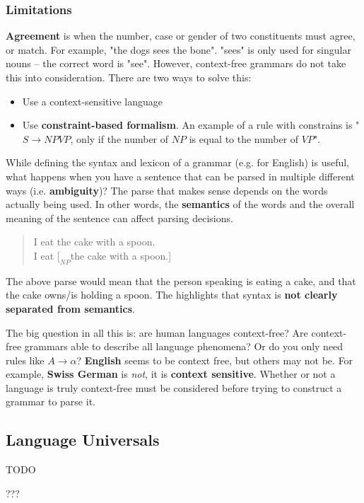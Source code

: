 \documentclass{article}
\begin{document}
\subsubsection{Limitations}

\textbf{Agreement} is when  the number, case or gender of two constituents must agree, or match. For example, "the dogs sees the bone". "sees" is only used for singular nouns -- the correct word is "see". However, context-free grammars do not take this into consideration. There are two ways to solve this:
\begin{itemize}
	\item Use a context-sensitive language
	\item Use \textbf{constraint-based formalism}. An example of a rule with constrains is "$S \rightarrow NP VP$, only if the number of $NP$ is equal to the number of $VP$".
\end{itemize}

While defining the syntax and lexicon of a grammar (e.g. for English) is useful, what happens when you have a sentence that can be parsed in multiple different ways (i.e. \textbf{ambiguity})? The parse that makes sense depends on the words actually being used. In other words, the \textbf{semantics} of the words and the overall meaning of the sentence can affect parsing decisions.
\begin{quote}
	I eat the cake with a spoon. \\
	I eat $[_{NP}$the cake with a spoon.]
\end{quote}
The above parse would mean that the person speaking is eating a cake, and that the cake owns/is holding a spoon. The highlights that syntax is \textbf{not clearly separated from semantics}.

The big question in all this is: are human languages context-free? Are context-free grammars able to describe all language phenomena? Or do you only need rules like $A \rightarrow \alpha$? \textbf{English} seems to be context free, but others may not be. For example, \textbf{Swiss German} is \textit{not}, it is \textbf{context sensitive}. Whether or not a language is truly context-free must be considered before trying to construct a grammar to parse it.

\subsection{Language Universals}

TODO

???
\end{document}

